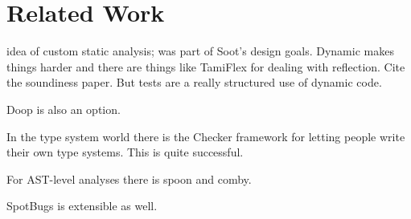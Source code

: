 \section{Related Work}

idea of custom static analysis; was part of Soot's design goals. Dynamic makes things harder and there are things like TamiFlex for dealing with reflection. Cite the soundiness paper. But tests are a really structured use of dynamic code.

Doop is also an option.

In the type system world there is the Checker framework for letting people write their own type systems. This is quite successful.

For AST-level analyses there is spoon and comby.

SpotBugs is extensible as well.



